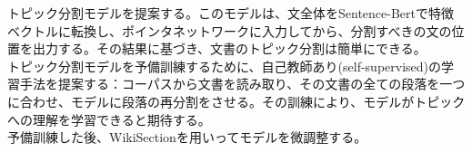 \documentclass[a4paper]{article}
\begin{document}
トピック分割モデルを提案する。このモデルは、文全体をSentence-Bert\cite{reimers2019sentence}で特徴ベクトルに転換し、ポインタネットワーク\cite{vinyals2015pointer}に入力してから、分割すべきの文の位置を出力する。その結果に基づき、文書のトピック分割は簡単にできる。\\

トピック分割モデルを予備訓練するために、自己教師あり(self-supervised)の学習手法を提案する：コーパスから文書を読み取り、その文書の全ての段落を一つに合わせ、モデルに段落の再分割をさせる。その訓練により、モデルがトピックへの理解を学習できると期待する。\\

予備訓練した後、WikiSectionを用いってモデルを微調整する。\\

\printbibliography
\end{document}
